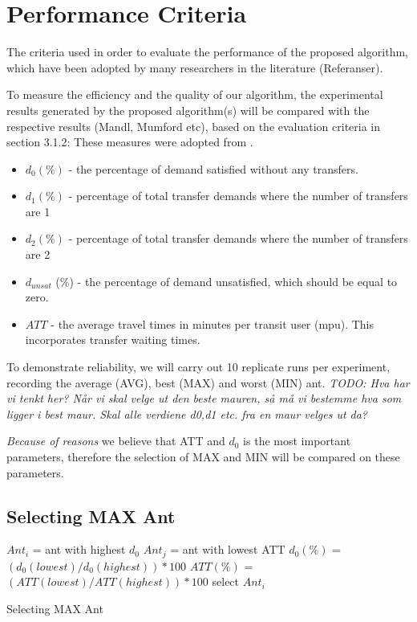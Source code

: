 \section{Performance Criteria}


The criteria used in order to evaluate the performance of the proposed algorithm, which have been adopted by many researchers in the literature (Referanser).

To measure the efficiency and the quality of our algorithm, the experimental results generated by the proposed algorithm(s) will be compared with the respective results (Mandl, Mumford etc), based on the evaluation criteria in section 3.1.2: 
These measures were adopted from \citet{kechagiopoulos14}.

\begin{itemize}
\item $d_0 (\%)$ - the percentage of demand satisfied without any transfers.
\item $d_1 (\%)$ - percentage of total transfer demands where the number of transfers are 1
\item $d_2 (\%)$ - percentage of total transfer demands where the number of transfers are 2
\item $d_{unsat}$ (\%) - the percentage of demand unsatisfied, which should be equal to zero.
\item $ATT$  - the average travel times in minutes per transit user (mpu). This incorporates transfer waiting times. 
\end{itemize}

To demonstrate reliability, we will carry out 10 replicate runs per experiment, recording the average (AVG), best (MAX) and worst (MIN) ant.  
\emph{\color{red} TODO: Hva har vi tenkt her? Når vi skal velge ut den beste mauren, så må vi bestemme hva som ligger i best maur. Skal alle verdiene d0,d1 etc. fra en maur velges ut da?}

\emph{\color{red} Because of reasons }we believe that ATT and $d_0$ is the most important parameters, therefore the selection of MAX and MIN will be compared on these parameters.

\subsection{Selecting MAX Ant}

\begin{algorithm}[H]
$Ant_{i}$ = ant with highest $d_0$\;
$Ant_{j}$ = ant with lowest ATT\;
{
	$d_0(\%)$ = $(d_0(lowest) / d_0(highest))*100$\;
	$ATT(\%)$ = $(ATT(lowest) / ATT(highest))*100$\;
	{
		select $Ant_{i}$
	}
}
 \caption{Selecting MAX Ant}
\end{algorithm}

